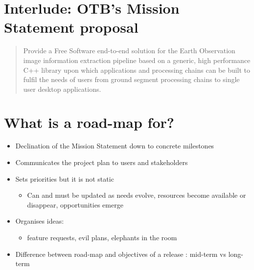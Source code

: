 \documentclass[8pt]{beamer}
\begin{document}
\section{Interlude: OTB's Mission Statement proposal}
\label{sec-5}
\begin{quote}
Provide a Free Software end-to-end solution for the Earth Observation
image information extraction pipeline based on a generic, high
performance C++ library upon which applications and processing chains
can be built to fulfil the needs of users from ground segment
processing chains to single user desktop applications.
\end{quote}

\section{What is a road-map for?}
\label{sec-6}
\begin{itemize}
\item Declination of the Mission Statement down to concrete milestones
\item Communicates the project plan to users and stakeholders
\item Sets priorities but it is not static
\begin{itemize}
\item Can and must be updated as needs evolve, resources become
available or disappear, opportunities emerge
\end{itemize}
\item Organises ideas:
\begin{itemize}
\item feature requests, evil plans, elephants in the room
\end{itemize}
\item Difference between road-map and objectives of a release : mid-term
vs long-term
\end{itemize}
\end{document}
